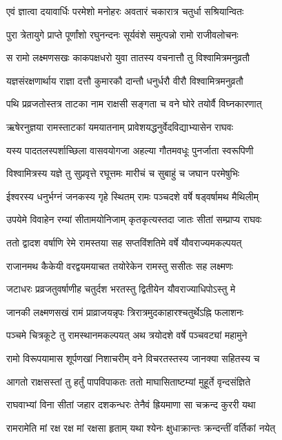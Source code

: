 \twolineshloka
{एवं ज्ञात्वा दयावार्धिः परमेशो मनोहरः}
{अवतारं चकारात्र चतुर्धा सश्रियान्वितः}%

\twolineshloka
{पुरा त्रेतायुगे प्राप्ते पूर्णांशो रघुनन्दनः}
{सूर्यवंशे समुत्पन्नो रामो राजीवलोचनः}%

\twolineshloka
{स रामो लक्ष्मणसखः काकपक्षधरो युवा}
{तातस्य वचनात्तौ तु विश्वामित्रमनुव्रतौ}%

\twolineshloka
{यज्ञसंरक्षणार्थाय राज्ञा दत्तौ कुमारकौ}
{दान्तौ धनुर्धरौ वीरौ विश्वामित्रमनुव्रतौ}%

\twolineshloka
{पथि प्रव्रजतोस्तत्र ताटका नाम राक्षसी}
{सङ्गता च वने घोरे तयोर्वै विघ्नकारणात्}%

\twolineshloka
{ऋषेरनुज्ञया रामस्ताटकां यमयातनाम्}
{प्रावेशयद्धनुर्वेदविद्याभ्यासेन राघवः}%

\twolineshloka
{यस्य पादतलस्पर्शाच्छिला वासवयोगजा}
{अहल्या गौतमवधूः पुनर्जाता स्वरूपिणी}%

\twolineshloka
{विश्वामित्रस्य यज्ञे तु सुप्रवृत्ते रघूत्तमः}
{मारीचं च सुबाहुं च जघान परमेषुभिः}%

\twolineshloka
{ईश्वरस्य धनुर्भग्नं जनकस्य गृहे स्थितम्}
{रामः पञ्चदशे वर्षे षड्वर्षामथ मैथिलीम्}%

\twolineshloka
{उपयेमे विवाहेन रम्यां सीतामयोनिजाम्}
{कृतकृत्यस्तदा जातः सीतां सम्प्राप्य राघवः}%

\twolineshloka
{ततो द्वादश वर्षाणि रेमे रामस्तया सह}
{सप्तविंशतिमे वर्षे यौवराज्यमकल्पयत्}%

\twolineshloka
{राजानमथ कैकेयी वरद्वयमयाचत}
{तयोरेकेन रामस्तु ससीतः सह लक्ष्मणः}%

\twolineshloka
{जटाधरः प्रव्रजतुवर्षाणीह चतुर्दश}
{भरतस्तु द्वितीयेन यौवराज्याधिपोऽस्तु मे}%

\twolineshloka
{जानकी लक्ष्मणसखं रामं प्राव्राजयन्नृपः}
{त्रिरात्रमुदकाहारश्चतुर्थेऽह्नि फलाशनः}%

\twolineshloka
{पञ्चमे चित्रकूटे तु रामस्थानमकल्पयत्}
{अथ त्रयोदशे वर्षे पञ्चवट्यां महामुने}%

\twolineshloka
{रामो विरूपयामास शूर्पणखां निशाचरीम्}
{वने विचरतस्तस्य जानक्या सहितस्य च}%

\twolineshloka
{आगतो राक्षसस्तां तु हर्तुं पापविपाकतः}
{ततो माघासिताष्टम्यां मुहूर्ते वृन्दसंज्ञिते}%

\twolineshloka
{राघवाभ्यां विना सीतां जहार दशकन्धरः}
{तेनैवं ह्रियमाणा सा चक्रन्द कुररी यथा}%

\twolineshloka
{रामरामेति मां रक्ष रक्ष मां रक्षसा हृताम्}
{यथा श्येनः क्षुधाक्रान्तः क्रन्दन्तीं वर्तिकां नयेत्}%

